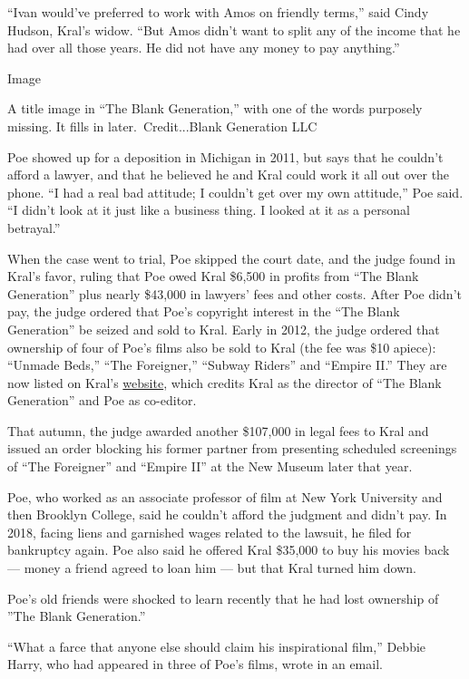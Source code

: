 ``Ivan would've preferred to work with Amos on friendly terms,'' said
Cindy Hudson, Kral's widow. ``But Amos didn't want to split any of the
income that he had over all those years. He did not have any money to
pay anything.''

Image

A title image in ``The Blank Generation,'' with one of the words
purposely missing. It fills in later.~Credit...Blank Generation LLC

Poe showed up for a deposition in Michigan in 2011, but says that he
couldn't afford a lawyer, and that he believed he and Kral could work it
all out over the phone. ``I had a real bad attitude; I couldn't get over
my own attitude,'' Poe said. ``I didn't look at it just like a business
thing. I looked at it as a personal betrayal.''

When the case went to trial, Poe skipped the court date, and the judge
found in Kral's favor, ruling that Poe owed Kral \$6,500 in profits from
``The Blank Generation'' plus nearly \$43,000 in lawyers' fees and other
costs. After Poe didn't pay, the judge ordered that Poe's copyright
interest in the ``The Blank Generation'' be seized and sold to Kral.
Early in 2012, the judge ordered that ownership of four of Poe's films
also be sold to Kral (the fee was \$10 apiece): ``Unmade Beds,'' ``The
Foreigner,'' ``Subway Riders'' and ``Empire II.'' They are now listed on
Kral's \href{https://theblankgeneration.com/}{website}, which credits
Kral as the director of ``The Blank Generation'' and Poe as co-editor.

That autumn, the judge awarded another \$107,000 in legal fees to Kral
and issued an order blocking his former partner from presenting
scheduled screenings of ``The Foreigner'' and ``Empire II'' at the New
Museum later that year.

Poe, who worked as an associate professor of film at New York University
and then Brooklyn College, said he couldn't afford the judgment and
didn't pay. In 2018, facing liens and garnished wages related to the
lawsuit, he filed for bankruptcy again. Poe also said he offered Kral
\$35,000 to buy his movies back --- money a friend agreed to loan him
--- but that Kral turned him down.

Poe's old friends were shocked to learn recently that he had lost
ownership of ''The Blank Generation.''

``What a farce that anyone else should claim his inspirational film,''
Debbie Harry, who had appeared in three of Poe's films, wrote in an
email.

